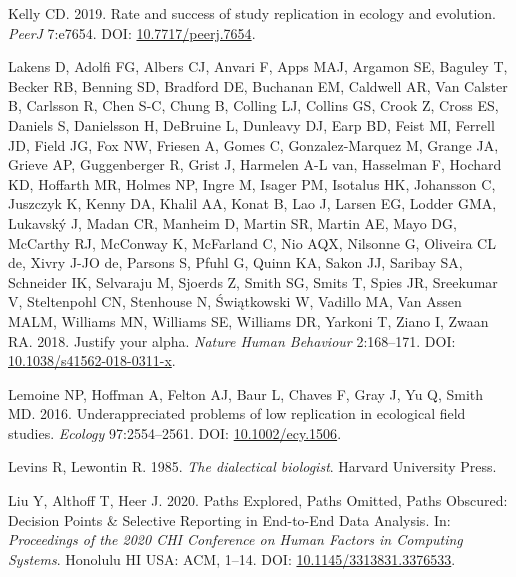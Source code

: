 \documentclass[10pt,a4paper]{article}
\newlength{\cslhangindent}
\newlength{\cslentryspacingunit} %
\newenvironment{CSLReferences}[2] %
 {%
  \setlength{\parindent}{0pt}
  \ifodd #1
  \let\oldpar\par
  \def\par{\hangindent=\cslhangindent\oldpar}
  \fi
  \setlength{\parskip}{#2\cslentryspacingunit}
 }%
 {}
\begin{document}
\begin{CSLReferences}{1}{0}
\leavevmode{}%
Kelly CD. 2019. Rate and success of study replication in ecology and evolution. \emph{PeerJ} 7:e7654. DOI: \href{https://doi.org/10.7717/peerj.7654}{10.7717/peerj.7654}.

\leavevmode{}%
Lakens D, Adolfi FG, Albers CJ, Anvari F, Apps MAJ, Argamon SE, Baguley T, Becker RB, Benning SD, Bradford DE, Buchanan EM, Caldwell AR, Van Calster B, Carlsson R, Chen S-C, Chung B, Colling LJ, Collins GS, Crook Z, Cross ES, Daniels S, Danielsson H, DeBruine L, Dunleavy DJ, Earp BD, Feist MI, Ferrell JD, Field JG, Fox NW, Friesen A, Gomes C, Gonzalez-Marquez M, Grange JA, Grieve AP, Guggenberger R, Grist J, Harmelen A-L van, Hasselman F, Hochard KD, Hoffarth MR, Holmes NP, Ingre M, Isager PM, Isotalus HK, Johansson C, Juszczyk K, Kenny DA, Khalil AA, Konat B, Lao J, Larsen EG, Lodder GMA, Lukavský J, Madan CR, Manheim D, Martin SR, Martin AE, Mayo DG, McCarthy RJ, McConway K, McFarland C, Nio AQX, Nilsonne G, Oliveira CL de, Xivry J-JO de, Parsons S, Pfuhl G, Quinn KA, Sakon JJ, Saribay SA, Schneider IK, Selvaraju M, Sjoerds Z, Smith SG, Smits T, Spies JR, Sreekumar V, Steltenpohl CN, Stenhouse N, Świątkowski W, Vadillo MA, Van Assen MALM, Williams MN, Williams SE, Williams DR, Yarkoni T, Ziano I, Zwaan RA. 2018. Justify your alpha. \emph{Nature Human Behaviour} 2:168--171. DOI: \href{https://doi.org/10.1038/s41562-018-0311-x}{10.1038/s41562-018-0311-x}.

\leavevmode{}%
Lemoine NP, Hoffman A, Felton AJ, Baur L, Chaves F, Gray J, Yu Q, Smith MD. 2016. Underappreciated problems of low replication in ecological field studies. \emph{Ecology} 97:2554--2561. DOI: \href{https://doi.org/10.1002/ecy.1506}{10.1002/ecy.1506}.

\leavevmode{}%
Levins R, Lewontin R. 1985. \emph{The dialectical biologist}. Harvard University Press.

\leavevmode{}%
Liu Y, Althoff T, Heer J. 2020. Paths {Explored}, {Paths} {Omitted}, {Paths} {Obscured}: {Decision} {Points} \& {Selective} {Reporting} in {End}-to-{End} {Data} {Analysis}. In: \emph{Proceedings of the 2020 {CHI} {Conference} on {Human} {Factors} in {Computing} {Systems}}. Honolulu HI USA: ACM, 1--14. DOI: \href{https://doi.org/10.1145/3313831.3376533}{10.1145/3313831.3376533}.


\end{CSLReferences}
\end{document}
